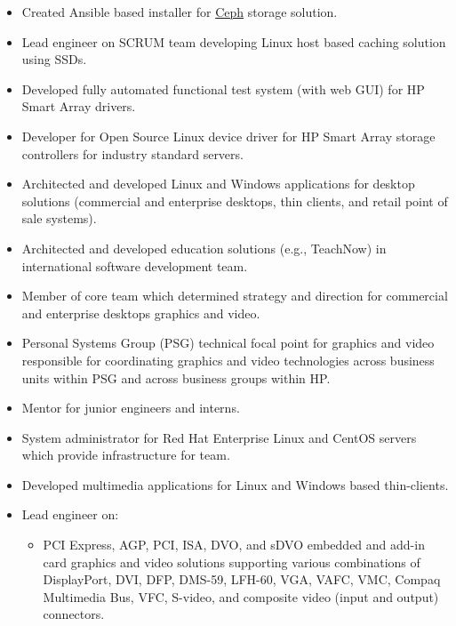 \documentclass[10pt,letterpaper,oneside]{report}
\begin{document}
\begin{itemize}
  \item Created Ansible based installer for \href{https://ceph.com}{Ceph}
    storage solution.

  \item Lead engineer on SCRUM team developing Linux host based caching
    solution using SSDs.

  \item Developed fully automated functional test system (with web GUI) for HP
    Smart Array drivers.

  \item Developer for Open Source Linux device driver for HP Smart Array
    storage controllers for industry standard servers.

  \item Architected and developed Linux and Windows applications for desktop
    solutions (commercial and enterprise desktops, thin clients, and retail
    point of sale systems).

  \item Architected and developed education solutions (e.g., TeachNow) in
    international software development team.

  \item Member of core team which determined strategy and direction for
    commercial and enterprise desktops graphics and video.

  \item Personal Systems Group (PSG) technical focal point for graphics and
    video responsible for coordinating graphics and video technologies across
    business units within PSG and across business groups within HP.

  \item Mentor for junior engineers and interns.

  \item System administrator for Red Hat Enterprise Linux and CentOS servers
    which provide infrastructure for team.

  \item Developed multimedia applications for Linux and Windows based
    thin-clients.

  \item Lead engineer on:
    \begin {itemize}
      \item PCI Express, AGP, PCI, ISA, DVO, and sDVO embedded and add-in card
        graphics and video solutions supporting various combinations of
        DisplayPort, DVI, DFP, DMS-59, LFH-60, VGA, VAFC, VMC, Compaq Multimedia
        Bus, VFC, S-video, and composite video (input and output) connectors.


\end{itemize}
\end{itemize}
\end{document}
